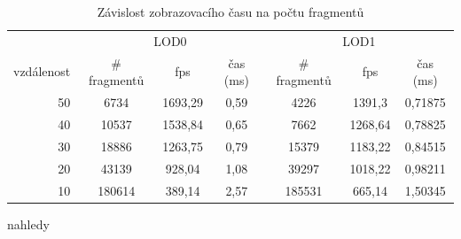 %
\begin{table}[here]
\centering
\begin{tabular}{|r | c | c | c | c | c | c |} 

\hline 
& \multicolumn{3}{|c|}{LOD0}& \multicolumn{3}{|c|}{LOD1}\\
vzdálenost & \# fragmentů & fps & čas (ms) & \# fragmentů & fps & čas (ms)\\ [0.5ex] 
\hline
50		&6734		&1693,29	&0,59	&4226		&1391,3		&0,71875\\
40		&10537		&1538,84	&0,65	&7662		&1268,64	&0,78825\\
30		&18886		&1263,75	&0,79	&15379		&1183,22	&0,84515\\
20		&43139		&928,04		&1,08	&39297		&1018,22	&0,98211\\
10		&180614	&389,14		&2,57	&185531	&665,14		&1,50345\\
 [1ex] 
\hline 
\end{tabular}
\label{table:lod01-fragtime}
\caption{Závislost zobrazovacího času na počtu fragmentů}

\end{table}
nahledy
